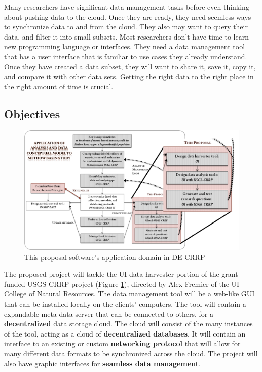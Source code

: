 Many researchers have significant data management tasks before even thinking 
about pushing data to the cloud. Once they are ready, they need seemless ways to
synchronize data to and from the cloud. They also may want to query their data,
and filter it into small subsets. Most researchers don't have time to learn
new programming language or interfaces. They need a data management tool 
that has a user 
interface that is familiar to use cases they already understand. Once they
have created a data subset, they will want to share it, save it, copy it, 
and compare it with other data sets. Getting the right data to the right place 
in the right amount of time is crucial.

\subsection{Objectives}

\begin{figure}[!h]
        \begin{center}
		\includegraphics[width=120mm]{images/combo_proposal}
                \caption{This proposal software's application domain in DE-CRRP}
                \label{combo_proposal}
        \end{center}
\end{figure}

The proposed project will tackle the UI data harvester portion of the grant 
funded USGS-CRRP project (Figure \ref{combo_proposal}), directed by Alex 
Fremier of the UI College of Natural Resources. The data management tool
will be a web-like GUI that can be installed locally on the clients' computers.
The tool will contain a expandable meta data server 
that can be connected to others, for a \textbf{decentralized} data storage
cloud. The cloud will consist of the many instances of the tool, acting as a
cloud of 
\textbf{decentralized databases}. It will contain an interface to an existing 
or custom \textbf{networking protocol} that will allow for many different data 
formats to be synchronized across the cloud. The project will also have graphic
interfaces for \textbf{seamless data management}.

